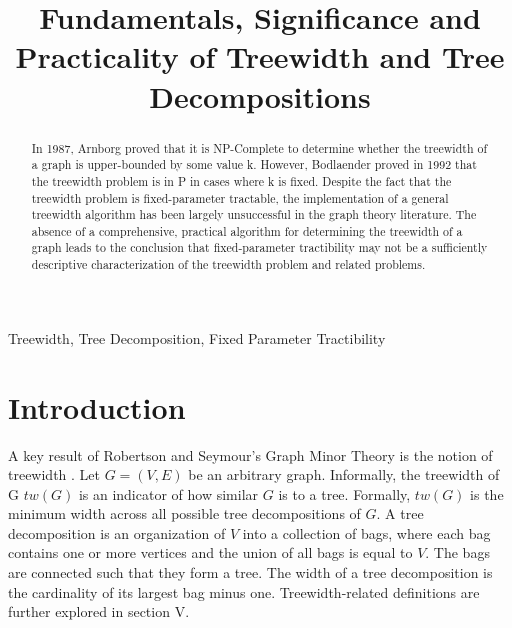 \documentclass[12pt,conference]{IEEEtran}
\theoremstyle{plain}
\begin{document}
\raggedbottom

\title{Fundamentals, Significance and Practicality of Treewidth and Tree Decompositions}

\author{
}

\maketitle

\begin{abstract}
In 1987, Arnborg proved that it is NP-Complete to determine whether the treewidth of a graph is upper-bounded by some value k. However, Bodlaender proved in 1992 that the treewidth problem is in P in cases where k is fixed. Despite the fact that the treewidth problem is fixed-parameter tractable, the implementation of a general treewidth algorithm has been largely unsuccessful in the graph theory literature. The absence of a comprehensive, practical algorithm for determining the treewidth of a graph leads to the conclusion that fixed-parameter tractibility may not be a sufficiently descriptive characterization of the treewidth problem and related problems.
\end{abstract}

\begin{IEEEkeywords}
Treewidth, Tree Decomposition, Fixed Parameter Tractibility
\end{IEEEkeywords}

\IEEEpeerreviewmaketitle

\section{Introduction}
A key result of Robertson and Seymour's Graph Minor Theory is the notion of treewidth \cite{treewidth-rob-seymour}. Let $G = (V,E)$ be an arbitrary graph. Informally, the treewidth of G $tw(G)$ is an indicator of how similar $G$ is to a tree. Formally, $tw(G)$ is the minimum width across all possible tree decompositions of $G$. A tree decomposition is an organization of $V$ into a collection of bags, where each bag contains one or more vertices and the union of all bags is equal to $V$. The bags are connected such that they form a tree. The width of a tree decomposition is the cardinality of its largest bag minus one. Treewidth-related definitions are further explored in section V.
\end{document}
